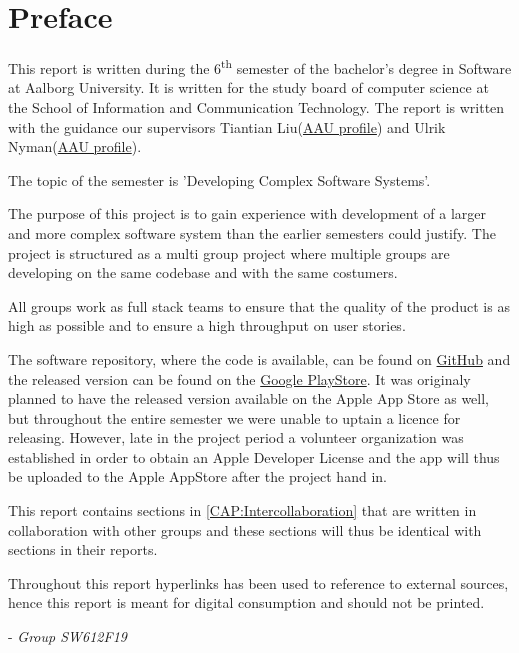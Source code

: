 \chapter*{Preface}
This report is written during the 6\textsuperscript{th} semester of the bachelor's degree in Software at Aalborg University.
It is written for the study board of computer science at the School of Information and Communication Technology.
The report is written with the guidance our supervisors Tiantian Liu(\href{http://personprofil.aau.dk/profil/145323}{AAU profile}) and Ulrik Nyman(\href{http://personprofil.aau.dk/profil/110550}{AAU profile}).

The topic of the semester is 'Developing Complex Software Systems'.

The purpose of this project is to gain experience with development of a larger and more complex software system than the earlier semesters could justify.
The project is structured as a multi group project where multiple groups are developing on the same codebase and with the same costumers.

All groups work as full stack teams to ensure that the quality of the product is as high as possible and to ensure a high throughput on user stories.

The software repository, where the code is available, can be found on \href{https://github.com/aau-giraf/}{GitHub} and the released version can be found on the \href{https://play.google.com/store/apps/details?id=dk.aau.cs.giraf.weekplanner}{Google PlayStore}.
It was originaly planned to have the released version available on the Apple App Store as well, but throughout the entire semester we were unable to uptain a licence for releasing.
However, late in the project period a volunteer organization was established in order to obtain an Apple Developer License and the app will thus be uploaded to the Apple AppStore after the project hand in.

This report contains sections in \autoref{CAP:Intercollaboration} that are written in collaboration with other groups and these sections will thus be identical with sections in their reports.

Throughout this report hyperlinks has been used to reference to external sources, hence this report is meant for digital consumption and should not be printed. 

- \textit{Group SW612F19}

\newpage
